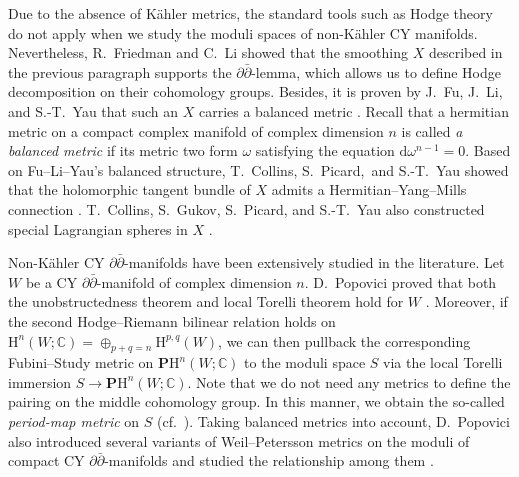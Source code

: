 Due to the absence of K\"{a}hler metrics,  
the standard tools such as Hodge theory do not apply
when we study the moduli spaces of non-K\"{a}hler CY manifolds.
Nevertheless, R.~Friedman \cite{2019-Friedman-the-ddbar-lemma-for-general-clemens-manifolds}
and C.~Li \cite{2022-Li-polarized-hodge-structures-for-clemens-manifolds}
showed that the smoothing \(X\) described in the previous paragraph
supports the \(\partial\bar{\partial}\)-lemma,
which allows us to define Hodge decomposition 
on their cohomology groups. 
Besides, it is proven by J.~Fu, J.~Li, and S.-T.~Yau 
that such an \(X\) carries a
balanced metric \cite{2012-Fu-Li-Yau-balanced-metrics-on-non-kahler-calabi-yau-threefolds}. 
Recall that a hermitian metric on a compact
complex manifold of complex dimension \(n\) is called \emph{a balanced metric} if its 
metric two form \(\omega\)
satisfying the equation \(\mathrm{d}\omega^{n-1}=0\).
Based on Fu--Li--Yau's 
balanced structure, T.~Collins, S.~Picard,~and S.-T.~Yau 
showed that the holomorphic tangent bundle of \(X\)
admits a Hermitian--Yang--Mills connection \cite{2024-Collins-Picard-Yau-stability-of-the-tangent-bundle-through-conifold-transitions}.
T.~Collins, S.~Gukov, S.~Picard, and S.-T.~Yau also
constructed special Lagrangian spheres in \(X\)
\cite{2023-Collins-Gukov-Picard-Yau-special-lagrangian-cycles-and-calabi-yau-transitions}.


Non-K\"{a}hler CY \(\partial\bar{\partial}\)-manifolds have been extensively studied
in the literature. Let \(W\) be a CY \(\partial\bar{\partial}\)-manifold
of complex dimension \(n\).
D.~Popovici proved that both the
unobstructedness theorem and local Torelli theorem hold
for \(W\)
\cite{2019-Popovici-holomorphic-deformations-of-balanced-calabi-yau-d-dbar-manifolds}.
Moreover, if the second Hodge--Riemann bilinear relation holds on 
\(\mathrm{H}^{n}(W;\mathbb{C})=\oplus_{p+q=n}\mathrm{H}^{p,q}(W)\),
we can then pullback the corresponding 
Fubini--Study metric on \(\mathbf{P}\mathrm{H}^{n}(W;\mathbb{C})\)
to the moduli space \(S\)
via the local Torelli immersion \(S\to \mathbf{P}\mathrm{H}^{n}(W;\mathbb{C})\).
Note that
we do not need any metrics to define the pairing on the middle cohomology group.
In this manner, we obtain the so-called \emph{period-map metric} on \(S\)
(cf.~\cite{2019-Popovici-holomorphic-deformations-of-balanced-calabi-yau-d-dbar-manifolds}). 
Taking balanced metrics into account, D.~Popovici also introduced several variants of Weil--Petersson metrics on the
moduli of compact CY \(\partial\bar{\partial}\)-manifolds
and studied the relationship among them
\cite{2019-Popovici-holomorphic-deformations-of-balanced-calabi-yau-d-dbar-manifolds}.

